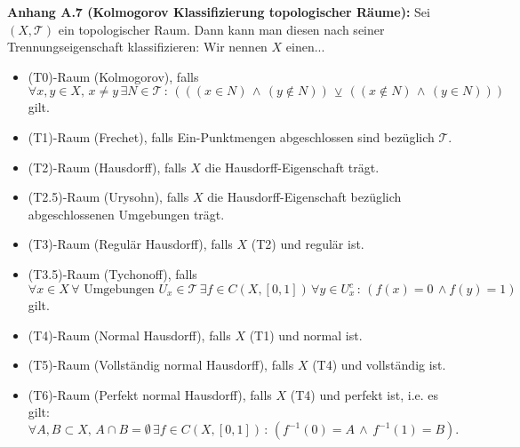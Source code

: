 \documentclass[
	language=german, %
	type=master, %
]{isthesis}
\begin{document}
\begin{appendix}
\colorbox{generalYellow}{\begin{minipage}{16cm}{\textcolor{black}{}{\label{defA.7}}}
\textbf{Anhang A.7 (Kolmogorov Klassifizierung topologischer Räume):} Sei \((X,\mathcal{T})\) ein topologischer Raum. Dann kann man diesen nach seiner Trennungseigenschaft klassifizieren: Wir nennen \(X\) einen...
\begin{itemize}
    \item (T0)-Raum (Kolmogorov), falls
    \begin{equation}
        \forall x,y \in X, \, x \neq y \, \exists N \in \mathcal{T} \, : \, (((x \in N) \, \land \, (y \notin N)) \, \veebar \, ((x \notin N) \, \land \, (y \in N)))
    \end{equation}
    gilt.
    \item (T1)-Raum (Frechet), falls Ein-Punktmengen abgeschlossen sind bezüglich \(\mathcal{T}\).
    \item (T2)-Raum (Hausdorff), falls \(X\) die Hausdorff-Eigenschaft trägt.
    \item (T2.5)-Raum (Urysohn), falls \(X\) die Hausdorff-Eigenschaft bezüglich abgeschlossenen Umgebungen trägt.
    \item (T3)-Raum (Regulär Hausdorff), falls \(X\) (T2) und regulär ist.
    \item (T3.5)-Raum (Tychonoff), falls
    \begin{equation}
        \forall x \in X \, \forall \text{ Umgebungen }U_x \in \mathcal{T} \, \exists f \in C(X,[0,1]) \, \forall y \in U^c_x \, : \, (f(x) = 0 \, \land f(y) = 1)
    \end{equation}
    gilt.
\end{itemize}
\end{minipage}}
\newpage
{}\colorbox{generalYellow}{\begin{minipage}{16cm}{\textcolor{black}{}{\label{defA.7b}}}
\begin{itemize}
    \item (T4)-Raum (Normal Hausdorff), falls \(X\) (T1) und normal ist.
    \item (T5)-Raum (Vollständig normal Hausdorff), falls \(X\) (T4) und vollständig ist.
    \item (T6)-Raum (Perfekt normal Hausdorff), falls \(X\) (T4) und perfekt ist, i.e. es gilt:
    \begin{equation}
        \forall A, B \subset X, \, A \cap B = \emptyset \, \exists f \in C(X,[0,1]) \, : \, (f^{-1}(0) = A \, \land \, f^{-1}(1) = B).
    \end{equation}
\end{itemize}
\end{minipage}}


\end{appendix}
\end{document}
